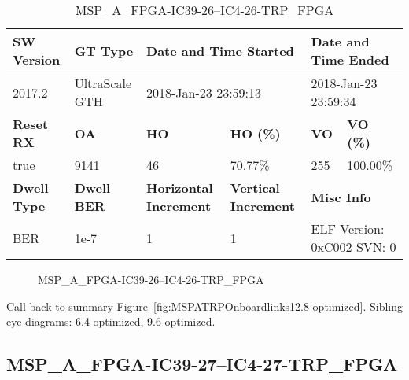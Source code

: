 \begin{table}[h]
\centering
\caption{MSP\_A\_FPGA-IC39-26--IC4-26-TRP\_FPGA}
\label{tab:MSPAFPGAIC3926IC426TRPFPGA12.8-optimized}
\begin{tabular}{@{}|l|l|l|l|l|l|@{}}
\toprule
\textbf{SW Version}                & \textbf{GT Type}   & \multicolumn{2}{l|}{\textbf{Date and Time Started}}            & \multicolumn{2}{l|}{\textbf{Date and Time Ended}}        \\ \midrule
2017.2                       & UltraScale GTH          & \multicolumn{2}{l|}{2018-Jan-23 23:59:13}                   & \multicolumn{2}{l|}{2018-Jan-23 23:59:34}               \\ \midrule
\textbf{Reset RX}                  & \textbf{OA} & \textbf{HO}   & \textbf{HO (\%)} & \textbf{VO} & \textbf{VO (\%)} \\ \midrule
true & 9141        & 46          & 70.77\%        & 255        & 100.00\%       \\ \midrule
\textbf{Dwell Type}                & \textbf{Dwell BER} & \textbf{Horizontal Increment} & \textbf{Vertical Increment}    & \multicolumn{2}{l|}{\textbf{Misc Info}}                  \\ \midrule
BER                            & 1e-7        & 1        & 1           & \multicolumn{2}{l|}{ELF Version: 0xC002 SVN: 0}                         \\ \bottomrule
\end{tabular}
\end{table}

\begin{figure}[h]
\caption{MSP\_A\_FPGA-IC39-26--IC4-26-TRP\_FPGA} \label{fig:MSPAFPGAIC3926IC426TRPFPGA12.8-optimized}
\end{figure}

Call back to summary Figure~\ref{fig:MSPATRPOnboardlinks12.8-optimized}.
Sibling eye diagrams: \hyperref[sec:MSPAFPGAIC3926IC426TRPFPGA6.4-optimized]{6.4-optimized}, \hyperref[sec:MSPAFPGAIC3926IC426TRPFPGA9.6-optimized]{9.6-optimized}.

\clearpage
\newpage


\subsection{MSP\_A\_FPGA-IC39-27--IC4-27-TRP\_FPGA}\label{sec:MSPAFPGAIC3927IC427TRPFPGA12.8-optimized}

